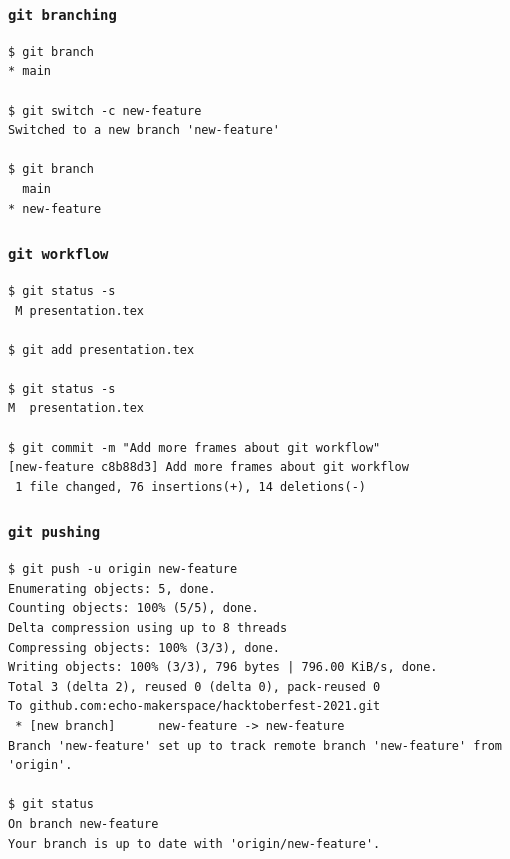 \documentclass[presentation]{beamer}
\begin{document}
  \begin{frame}[fragile]
    \frametitle{\texttt{git branching}}
 
    \begin{lstlisting}
$ git branch
* main

$ git switch -c new-feature
Switched to a new branch 'new-feature'

$ git branch
  main
* new-feature
    \end{lstlisting}
  \end{frame}

  \begin{frame}[fragile]
    \frametitle{\texttt{git workflow}}
 
    \begin{lstlisting}
$ git status -s
 M presentation.tex

$ git add presentation.tex 

$ git status -s
M  presentation.tex

$ git commit -m "Add more frames about git workflow"
[new-feature c8b88d3] Add more frames about git workflow
 1 file changed, 76 insertions(+), 14 deletions(-)
    \end{lstlisting}
  \end{frame}

  \begin{frame}[fragile]
    \frametitle{\texttt{git pushing}}
 
    \begin{lstlisting}
$ git push -u origin new-feature
Enumerating objects: 5, done.
Counting objects: 100% (5/5), done.
Delta compression using up to 8 threads
Compressing objects: 100% (3/3), done.
Writing objects: 100% (3/3), 796 bytes | 796.00 KiB/s, done.
Total 3 (delta 2), reused 0 (delta 0), pack-reused 0
To github.com:echo-makerspace/hacktoberfest-2021.git
 * [new branch]      new-feature -> new-feature
Branch 'new-feature' set up to track remote branch 'new-feature' from 'origin'.

$ git status
On branch new-feature
Your branch is up to date with 'origin/new-feature'.
    \end{lstlisting}
  \end{frame}
\end{document}
